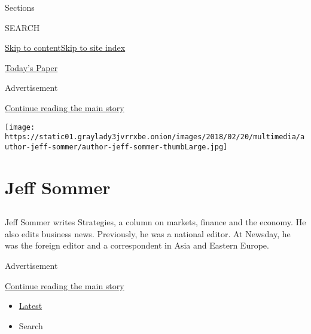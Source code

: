 Sections

SEARCH

\protect\hyperlink{site-content}{Skip to
content}\protect\hyperlink{site-index}{Skip to site index}

\href{https://myaccount.nytimes3xbfgragh.onion/auth/login?response_type=cookie\&client_id=vi}{}

\href{https://www.nytimes3xbfgragh.onion/section/todayspaper}{Today's
Paper}

Advertisement

\protect\hyperlink{after-top}{Continue reading the main story}

\texttt{[image: https://static01.graylady3jvrrxbe.onion/images/2018/02/20/multimedia/author-jeff-sommer/author-jeff-sommer-thumbLarge.jpg]}

\hypertarget{jeff-sommer}{%
\section{Jeff Sommer}\label{jeff-sommer}}

\hypertarget{section}{%
\subsection{}\label{section}}

Jeff Sommer writes Strategies, a column on markets, finance and the
economy. He also edits business news. Previously, he was a national
editor. At Newsday, he was the foreign editor and a correspondent in
Asia and Eastern Europe.

Advertisement

\protect\hyperlink{after-mid1}{Continue reading the main story}

\begin{itemize}
\tightlist
\item
  \protect\hyperlink{stream-panel}{Latest}
\item
  Search
\end{itemize}

